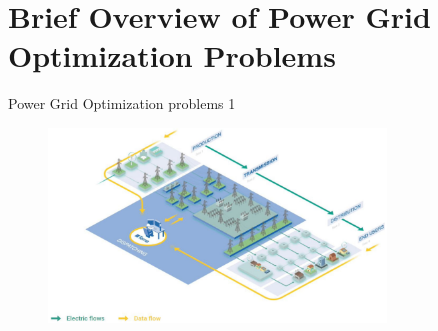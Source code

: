 \documentclass[11pt, aspectratio=169]{beamer}
\begin{document}
\section{Brief Overview of Power Grid Optimization Problems}
\begin{frame}{Power Grid Optimization problems 1}
  
    \begin{figure}
        \centering
        \includegraphics[width=0.8\textwidth]{photo_2023-09-26_14-27-16.jpg}

        \label{fig:enter-label}
    \end{figure}
\end{frame}
\end{document}
